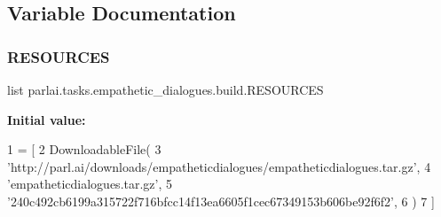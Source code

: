 \subsection{Variable Documentation}
\mbox{\label{namespaceparlai_1_1tasks_1_1empathetic__dialogues_1_1build_a9d2945e43f4f4d167ef6d78275f37490}} 
\subsubsection{\texorpdfstring{R\+E\+S\+O\+U\+R\+C\+ES}{RESOURCES}}
{\footnotesize\ttfamily list parlai.\+tasks.\+empathetic\+\_\+dialogues.\+build.\+R\+E\+S\+O\+U\+R\+C\+ES}

{\bfseries Initial value\+:}
\begin{DoxyCode}
1 =  [
2     DownloadableFile(
3         \textcolor{stringliteral}{'http://parl.ai/downloads/empatheticdialogues/empatheticdialogues.tar.gz'},
4         \textcolor{stringliteral}{'empatheticdialogues.tar.gz'},
5         \textcolor{stringliteral}{'240c492cb6199a315722f716bfcc14f13ea6605f1cec67349153b606be92f6f2'},
6     )
7 ]
\end{DoxyCode}
